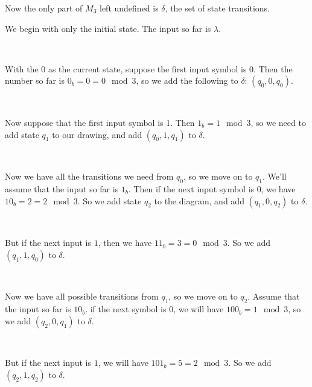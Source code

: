 \documentclass{bcthesis}
\newenvironment{exstep}[1]
		{
			\begin{minipage}{0.5 \textwidth}
				#1
			\end{minipage} \begin{minipage}{0.5 \paperwidth}
		}
		{
			\end{minipage}\\[0.5 em]
		}
\begin{document}
		Now the only part of $M_3$ left undefined is $\delta$, the set of state transitions.

			\begin{exstep}
				{
					We begin with only the initial state.
					The input so far is $\lambda$.
				}
				
			\end{exstep}

			\begin{exstep}
				{
					With the 0 as the current state, suppose the first input symbol is 0. 
					Then the number so far is $0_b = 0 = 0 \mod 3$, so we add the following to $\delta$: $(q_0, 0, q_0)$.
				}
				
			\end{exstep}

			\begin{exstep}
				{
					Now suppose that the first input symbol is 1. 
					Then $1_b = 1 \mod 3$, so we need to add state $q_1$ to our drawing, and add $(q_0, 1, q_1)$ to $\delta$.
				}
				
			\end{exstep}

			\begin{exstep}
				{
					Now we have all the transitions we need from $q_0$, so we move on to $q_1$.
					We'll assume that the input so far is $1_b$.
					Then if the next input symbol is $0$, we have $10_b = 2 = 2 \mod 3$.
					So we add state $q_2$ to the diagram, and add $(q_1, 0, q_2)$ to $\delta$.
				}
				
			\end{exstep}

			\begin{exstep}
				{
					But if the next input is $1$, then we have $11_b = 3 = 0 \mod 3$.
					So we add $(q_1, 1, q_0)$ to $\delta$.
				}
				
			\end{exstep}
			

			\begin{exstep}
				{
				Now we have all possible transitions from $q_1$, so we move on to $q_2$.
				Assume that the input so far is $10_b$.
				if the next symbol is $0$, we will have $100_b = 1 \mod 3$, so we add $(q_2, 0, q_1)$ to $\delta$.
				}
				
			\end{exstep}
			
			\begin{exstep}
				{
					But if the next input is $1$, we will have $101_b = 5 = 2 \mod 3$.
					So we add $(q_2, 1, q_2)$ to $\delta$.
				}
				
			\end{exstep}
\end{document}
